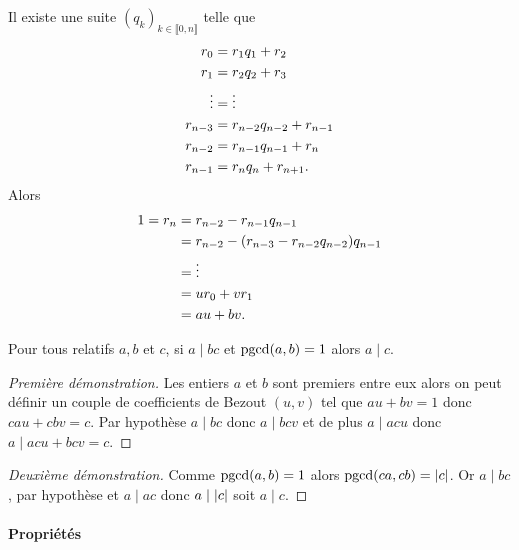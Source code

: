 Il existe une suite \((q_k)_{k \in \llbracket 0, n \rrbracket}\) telle que
\begin{align}
  r_0 &= r_1 q_1+r_2 \\
  r_1 &= r_2 q_2+r_3 \\
  \vdots &= \vdots \notag \\
  r_{n-3} &=r_{n-2} q_{n-2}+ r_{n-1} \\
  r_{n-2} &=r_{n-1} q_{n-1}+ r_{n} \\
  r_{n-1} &=r_{n} q_{n}+ r_{n+1}. 
\end{align}
Alors
\begin{align}
  1=r_n&=r_{n-2} -r_{n-1}q_{n-1} \\
  &=r_{n-2} - (r_{n-3} -r_{n-2}q_{n-2})q_{n-1}\\
  &= \vdots \notag \\
  &=ur_0 + vr_1\\
  &=au+bv.
\end{align}

\begin{theo}
  Pour tous relatifs \(a,b\) et \(c\), si \(a \mid bc\) et \(\operatorname{pgcd}(a,b)=1\) alors \(a \mid c\).
\end{theo}
\begin{proof}[Première démonstration]
  Les entiers \(a\) et \(b\) sont premiers entre eux alors on peut définir un couple de coefficients de Bezout \((u,v)\) tel que \(au+bv=1\) donc \(cau+cbv=c\). Par hypothèse \(a \mid bc\) donc \(a \mid bcv\) et de plus \(a \mid acu\) donc \(a \mid acu+bcv =c\).
\end{proof}
\begin{proof}[Deuxième démonstration]
 Comme \(\operatorname{pgcd}(a,b)=1\) alors \(\operatorname{pgcd}(ca,cb)=\left\lvert c\right\rvert\). Or \(a \mid bc\), par hypothèse et \(a \mid ac\) donc \(a \mid \left\lvert c\right\rvert\) soit \(a \mid c\).
\end{proof}

\paragraph{Propriétés}

